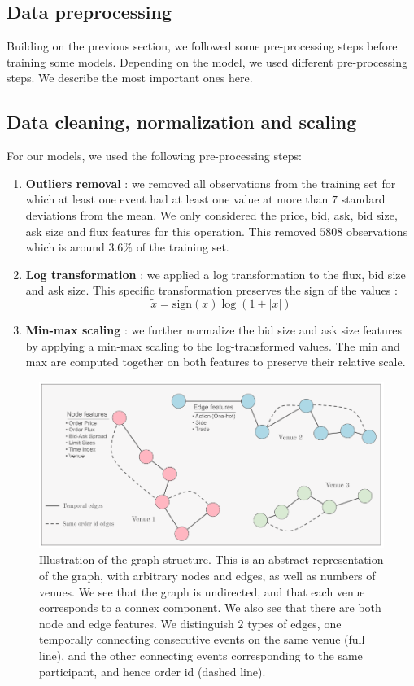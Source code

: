 \documentclass[switch, 11pt]{article}
\begin{document}
\begin{multicols}{2}
    \section{Data preprocessing}

    Building on the previous section, we followed some pre-processing steps before training some models. Depending on the model, we used different pre-processing steps. We describe the most important ones here.

    \subsection{Data cleaning, normalization and scaling}

    For our models, we used the following pre-processing steps:
    \begin{enumerate}
        \item \textbf{Outliers removal} : we removed all observations from the training set for which at least one event had at least one value at more than $7$ standard deviations from the mean. We only considered the price, bid, ask, bid size, ask size and flux features for this operation. This removed $5808$ observations which is around $3.6\%$ of the training set.
        \item \textbf{Log transformation} : we applied a log transformation to the flux, bid size and ask size. This specific transformation preserves the sign of the values :
              $$\tilde{x}= \text{sign}(x)\log(1+|x|)$$
        \item \textbf{Min-max scaling} : we further normalize the bid size and ask size features by applying a min-max scaling to the log-transformed values. The min and max are computed together on both features to preserve their relative scale.
    \end{enumerate}

\end{multicols}
\begin{figure}
    \centering
    \includegraphics[width=0.7\columnwidth]{figures/graph_structure.png}
    \caption{Illustration of the graph structure. This is an abstract representation of the graph, with arbitrary nodes and edges, as well as numbers of venues. We see that the graph is undirected, and that each venue corresponds to a connex component. We also see that there are both node and edge features. We distinguish $2$ types of edges, one temporally connecting consecutive events on the same venue (full line), and the other connecting events corresponding to the same participant, and hence order id (dashed line).}
    \label{fig:graph_structure}
\end{figure}
\end{document}
